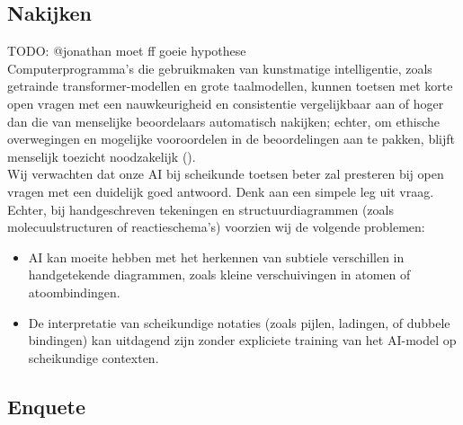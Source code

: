 \documentclass[12pt]{article}
\begin{document}
\begin{multicols}{2}
\subsection{Nakijken}
TODO: @jonathan moet ff goeie hypothese\\
Computerprogramma's die gebruikmaken van kunstmatige intelligentie, zoals getrainde transformer-modellen en grote taalmodellen, kunnen toetsen met korte open vragen met een nauwkeurigheid en consistentie vergelijkbaar aan of hoger dan die van menselijke beoordelaars automatisch nakijken; echter, om ethische overwegingen en mogelijke vooroordelen in de beoordelingen aan te pakken, blijft menselijk toezicht noodzakelijk (\cite{gobrecht2024humansubjectivityerrornovel, kumar2020scoredusingautosas, schneider2024llmbasedautogradingshorttextual}).
\\
Wij verwachten dat onze AI bij scheikunde toetsen beter zal presteren bij open vragen met een duidelijk goed antwoord. Denk aan een simpele leg uit vraag.
Echter, bij handgeschreven tekeningen en structuurdiagrammen (zoals molecuulstructuren of reactieschema's) voorzien wij de volgende problemen: 
\begin{itemize} 
    \item AI kan moeite hebben met het herkennen van subtiele verschillen in handgetekende diagrammen, zoals kleine verschuivingen in atomen of atoombindingen. 
    \item De interpretatie van scheikundige notaties (zoals pijlen, ladingen, of dubbele bindingen) kan uitdagend zijn zonder expliciete training van het AI-model op scheikundige contexten. 
\end{itemize}

\pagebreak
\subsection{Enquete}


\end{multicols}
\end{document}
